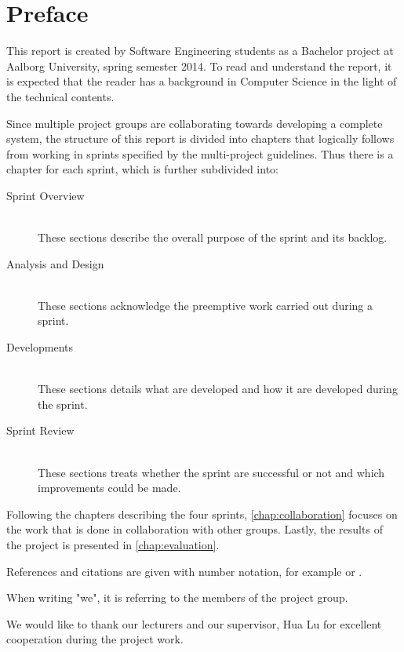 \newcommand{\headerPreface}{Preface}
\cleardoublepage
{}
\pdfbookmark{\headerPreface}{chap:preface}
\chapter*{\headerPreface}\label{chap:preface}
This report is created by Software Engineering students as a Bachelor project at Aalborg University, spring semester 2014.
To read and understand the report, it is expected that the reader has a background in Computer Science in the light of the technical contents.


Since multiple project groups are collaborating towards developing a complete system, the structure of this report is divided into chapters that logically follows from working in sprints specified by the multi-project guidelines.
Thus there is a chapter for each sprint, which is further subdivided into:

\begin{description}
\item[Sprint Overview] \hfill \\
These sections describe the overall purpose of the sprint and its backlog.
\item[Analysis and Design] \hfill \\
These sections acknowledge the preemptive work carried out during a sprint.
\item[Developments] \hfill \\
These sections details what are developed and how it are developed during the sprint.
\item[Sprint Review] \hfill \\
These sections treats whether the sprint are successful or not and which improvements could be made.
\end{description}

Following the chapters describing the four sprints, \cref{chap:collaboration} focuses on the work that is done in collaboration with other groups.
Lastly, the results of the project is presented in \cref{chap:evaluation}.

References and citations are given with number notation, for example \citet{launcher2011} or \cite{launcher2011}. 

When writing "we", it is referring to the members of the project group.

We would like to thank our lecturers and our supervisor, Hua Lu for excellent cooperation during the project work.
